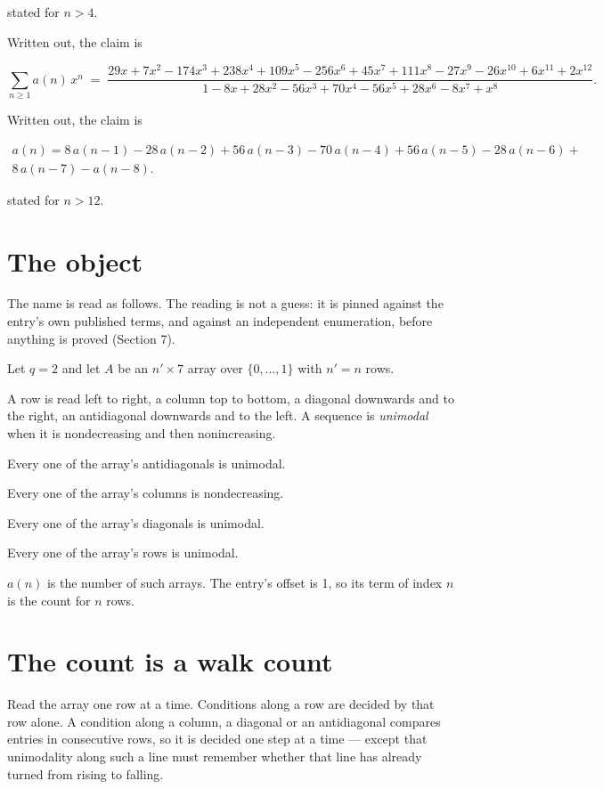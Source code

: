 \documentclass[11pt]{article}
\theoremstyle{definition}
\begin{document}
stated for $n > 4$.

Written out, the claim is

\[\sum_{n \ge 1} a(n)\,x^n \;=\; \frac{29x + 7x^{2} - 174x^{3} + 238x^{4} + 109x^{5} - 256x^{6} + 45x^{7} + 111x^{8} - 27x^{9} - 26x^{10} + 6x^{11} + 2x^{12}}{1 - 8x + 28x^{2} - 56x^{3} + 70x^{4} - 56x^{5} + 28x^{6} - 8x^{7} + x^{8}}.\]

Written out, the claim is

\begin{multline*} a(n) = 8\,a(n-1) - 28\,a(n-2) + 56\,a(n-3) - 70\,a(n-4) + 56\,a(n-5) - 28\,a(n-6) + \\ 8\,a(n-7) - a(n-8). \end{multline*}

stated for $n > 12$.

\section{The object}

The name is read as follows. The reading is not a guess: it is pinned against the entry's own published terms, and against an independent enumeration, before anything is proved (Section 7).

Let $q = 2$ and let $A$ be an $n' \times 7$ array over $\{0,\dots,1\}$ with $n' = n$ rows.

A row is read left to right, a column top to bottom, a diagonal downwards and to the right, an antidiagonal downwards and to the left. A sequence is {\itshape unimodal} when it is nondecreasing and then nonincreasing.

Every one of the array's antidiagonals is unimodal.

Every one of the array's columns is nondecreasing.

Every one of the array's diagonals is unimodal.

Every one of the array's rows is unimodal.

$a(n)$ is the number of such arrays. The entry's offset is 1, so its term of index $n$ is the count for $n$ rows.

\section{The count is a walk count}

Read the array one row at a time. Conditions along a row are decided by that row alone. A condition along a column, a diagonal or an antidiagonal compares entries in consecutive rows, so it is decided one step at a time --- except that unimodality along such a line must remember whether that line has already turned from rising to falling.
\end{document}

